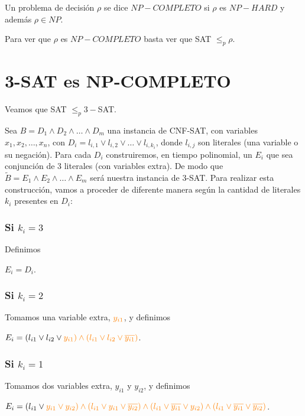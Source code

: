 \documentclass[10pt,a4paper]{article}
\begin{document}
Un problema de decisión $\rho$ se dice $NP-COMPLETO
$ si $\rho$ es $NP-HARD$ y además $\rho \in NP$.

Para ver que $\rho$ es $NP-COMPLETO
$ basta ver que SAT $\leq_p \rho$.

\section*{3-SAT es NP-COMPLETO}

Veamos que SAT $\leq_p 3-$SAT.

Sea $B = D_1 \land D_2 \land \dots \land D_m$ una instancia de CNF-SAT, con variables $x_1, x_2, \dots, x_n$, con $D_i = l_{i,1} \lor l_{i,2}\lor \dots \lor l_{i, k_i}$, donde $l_{i,j}$ son literales (una variable o su negación). Para cada $D_i$ construiremos, en tiempo polinomial, un $E_i$ que sea conjunción de 3 literales (con variables extra). De modo que $\tilde B = E_1 \land E_2 \land \dots \land E_m$ será nuestra instancia de 3-SAT. Para realizar esta construcción, vamos a proceder de diferente manera según la cantidad de literales $k_i$ presentes en $D_i$:

\subsubsection*{Si $k_i = 3$}

Definimos

\begin{center}
$E_i = D_i$.
\end{center}

\subsubsection*{Si $k_i = 2$}

Tomamos una variable extra, $\color{orange}{y_{i1}}$, y definimos

\begin{center}
$E_i = (l_{i1} \lor l_{i2} \lor \color{orange}{y_{i1}}) \land (l_{i1} \lor l_{i2} \lor \color{orange}{\overline{y_{i1}}})$.
\end{center}

\subsubsection*{Si $k_i = 1$}

Tomamos dos variables extra, $y_{i1}$ y $y_{i2}$, y definimos

\begin{center}
$E_i = (l_{i1} \lor \color{orange}{y_{i1}} \lor \color{orange}{y_{i2}}) \land (l_{i1} \lor \color{orange}{y_{i1}} \lor \color{orange}{\overline{y_{i2}}}) \land (l_{i1} \lor \color{orange}{\overline{y_{i1}}} \lor \color{orange}{y_{i2}}) \land (l_{i1} \lor \color{orange}{\overline{y_{i1}}} \lor \color{orange}{\overline{y_{i2}}})$.
\end{center}
\end{document}
